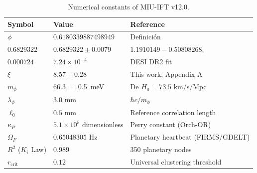 \documentclass[12pt, a4paper]{article}
\theoremstyle{miuThm}
\theoremstyle{remark}
\newcommand{\qborn}{1.1910149}
\newcommand{\qcrit}{0.50808268}
\newcommand{\DeltaCOD}{0.6829322}
\newcommand{\eps}{0.000724}
\newcommand{\phiGolden}{0.6180339887498949}
\newcommand{\OmegaF}{0.65048305}
\newcommand{\Rtwo}{0.989}
\begin{document}
\begin{table}[h!]
\centering
\caption{Numerical constants of MIU-IFT v12.0.}
\label{tab:constantes_completas}
\begin{tabular}{lll}
\toprule
\textbf{Symbol} & \textbf{Value} & \textbf{Reference} \\
\midrule
$\phi$ & $\phiGolden$ & Definición \\
$\DeltaCOD$ & $0.6829322 \pm 0.0079$ & $\qborn-\qcrit$, \cite{IBM2025} \\
$\eps$ & $7.24\times10^{-4}$ & DESI DR2 fit \\
$\xi$ & $8.57 \pm 0.28$ & This work, Appendix A \\
$m_\phi$ & \SI{66.3 \pm 0.5}{\milli\electronvolt} & De $H_0 = 73.5$ km/s/Mpc \\
$\lambda_\phi$ & $3.0$ mm & $\hbar c/m_\phi$ \\
$\ell_0$ & $0.5$ mm & Reference correlation length \\
$\kappa_P$ & $5.1\times10^5$ dimensionless & Perry constant (Orch-OR) \\
$\Omega_F$ & $\OmegaF$ Hz & Planetary heartbeat (FIRMS/GDELT) \\
$R^2$ ($K_i$ Law) & $\Rtwo$ & 350 planetary nodes \\
$r_{\text{crit}}$ & $0.12$ & Universal clustering threshold \\
\bottomrule
\end{tabular}
\end{table}
\end{document}
